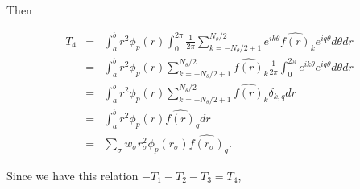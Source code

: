 Then
\begin{center}
\begin{eqnarray}
 T_4&=& \int_a^b r^2\phi_p(r) \int_0^{2\pi} \frac{1}{2\pi} \sum_{k=-N_\theta/2+1}^{N_\theta/2} e^{ik\theta} \widehat{f(r)}_k e^{iq\theta} d\theta dr \\
    &=& \int_a^b r^2\phi_p(r) \sum_{k=-N_\theta/2+1}^{N_\theta/2} \widehat{f(r)}_k \frac{1}{2\pi} \int_0^{2\pi}  e^{ik\theta} e^{iq\theta} d\theta dr \\
    &=& \int_a^b r^2\phi_p(r) \sum_{k=-N_\theta/2+1}^{N_\theta/2} \widehat{f(r)}_k \delta_{k,q} dr\\
    &=& \int_a^b r^2\phi_p(r) \widehat{f(r)}_q dr\\
    &=& \sum_\sigma w_\sigma r_\sigma^2\phi_p(r_\sigma) \widehat{f(r_\sigma)}_q.
\end{eqnarray}
\end{center}


Since we have this relation $- T_1 - T_2 - T_3 = T_4$,

